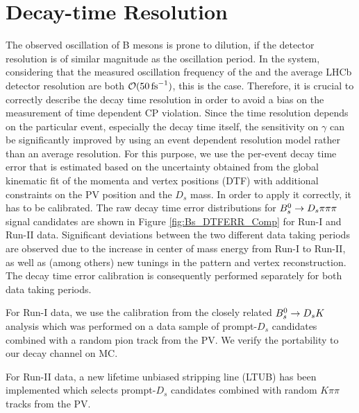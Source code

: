 
\clearpage
\section{Decay-time Resolution}
\label{sec:Resolution}

The observed oscillation of B mesons is prone to dilution, if the detector resolution is of similar magnitude as the oscillation period. 
In the \Bs system, considering that the measured oscillation frequency of the \Bs \cite{PDG2014} and the average LHCb detector resolution \cite{LHCb-DP-2014-002} are both 
$\mathcal{O}(50 \mathrm{ \,fs}^{-1})$, this is the case.
Therefore, it is crucial to correctly describe the decay time resolution in order to avoid a bias on the measurement of time dependent CP violation. 
Since the time resolution depends on the particular event, especially the decay time itself, 
the sensitivity on $\gamma$ can be significantly improved 
by using an event dependent resolution model rather than an average resolution.
For this purpose, we use the per-event decay time error that is estimated %
based on the
uncertainty obtained from the global kinematic fit of the momenta and vertex positions (DTF) with additional constraints on the PV position and the $D_s$ mass.
In order to apply it correctly, it has to be calibrated.
The raw decay time error distributions 
for ${{B}^0_{s}}\rightarrow{\ensuremath{{D}_{s}}}{\ensuremath{\pi}}{\ensuremath{\pi}}{\ensuremath{\pi}}$ signal candidates
are shown in Figure \ref{fig:Bs_DTFERR_Comp} for Run-I and Run-II data.
Significant deviations between the two different data taking periods are observed
due to the increase in center of mass energy from Run-I to Run-II, as well as (among others) new tunings in the pattern and vertex reconstruction.
The decay time error calibration is consequently performed separately for both data taking periods.

For Run-I data, we use the calibration from the closely related ${{B}^0_{s}}\rightarrow{\ensuremath{{D}_{s}}}{\ensuremath{K}}$ analysis which was performed on a data sample of prompt-$D_s$ candidates combined with a random pion track from the PV. We verify the portability to our decay channel on MC.

For Run-II data, a new lifetime unbiased stripping line (LTUB) has been implemented which selects prompt-$D_s$ candidates combined with random $K\pi\pi$ tracks from the PV.




